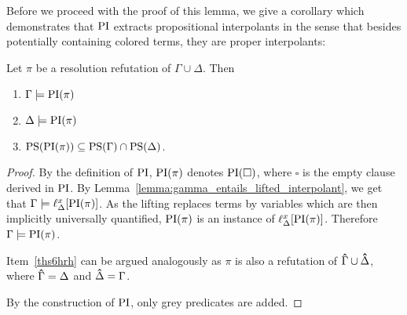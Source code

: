 Before we proceed with the proof of this lemma, we give a corollary which demonstrates that $\operatorname{PI}$ 
extracts propositional interpolants in the sense that besides potentially containing colored terms, they are proper interpolants:



\begin{cor}
	Let $\pi$ be a resolution refutation of $\Gamma \cup \Delta$.
	Then
	\begin{enumerate}
		\item$\Gamma\models \operatorname{PI}(\pi)$
		\item$\Delta\models \operatorname{PI}(\pi)$
			\label{ths6hrh}
		\item $\operatorname{PS}(\operatorname{PI}(\pi)) \subseteq \operatorname{PS}(\Gamma) \cap \operatorname{PS}(\Delta)$.
		\end{enumerate}
\end{cor}
\begin{proof}
	By the definition of $\operatorname{PI}$, 
	$\operatorname{PI}(\pi)$ denotes $\operatorname{PI}(\square)$, where $\square$ is the empty clause derived in $\operatorname{PI}$.
	By Lemma~\ref{lemma:gamma_entails_lifted_interpolant}, we get that 
	$ \Gamma \models \ell_{\Delta}^{x}[\operatorname{PI}(\pi)]$.
	As the lifting replaces terms by variables which are then implicitly universally quantified, $\operatorname{PI}(\pi)$ is an instance of $\ell_{\Delta}^{x}[\operatorname{PI}(\pi)]$.
	Therefore $\Gamma \models \operatorname{PI}(\pi)$.

	Item~\ref{ths6hrh} can be argued analogously as $\pi$ is also a refutation of $\bm\hat \Gamma \cup \bm\hat \Delta$, where $\bm\hat\Gamma = \Delta$ and $\bm\hat\Delta = \Gamma$.

	By the construction of $\operatorname{PI}$, only grey predicates are added.
\end{proof}

